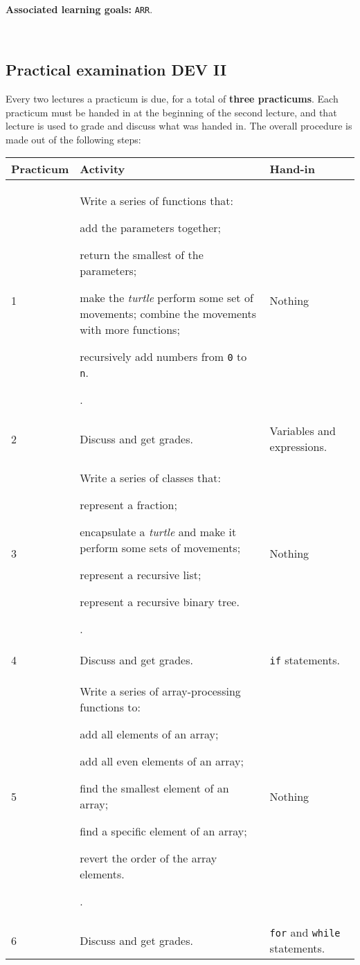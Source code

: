 \documentclass[12pt,a4paper,final]{article}
\begin{document}
\ \\ 

\textbf{Associated learning goals:} \texttt{ARR}.

\ \\ 

\subsection{Practical examination DEV II}
Every two lectures a practicum is due, for a total of \textbf{three practicums}. Each practicum must be handed in at the beginning of the second lecture, and that lecture is used to grade and discuss what was handed in. The overall procedure is made out of the following steps:

\begin{tabular}{| l | p{8cm} | p{4cm} |}
\hline
\textbf{Practicum} & \textbf{Activity} & \textbf{Hand-in} \\
\hline
1 & Write a series of functions that: 
\begin{inparaenum}
\item add the parameters together;
\item return the smallest of the parameters;
\item make the \textit{turtle} perform some set of movements; combine the movements with more functions;
\item recursively add numbers from \texttt{0} to \texttt{n}.
\end{inparaenum}. & Nothing \\
\hline
2 & Discuss and get grades. & Variables and expressions. \\
\hline
3 & Write a series of classes that:
\begin{inparaenum}
\item represent a fraction;
\item encapsulate a \textit{turtle} and make it perform some sets of movements;
\item represent a recursive list;
\item represent a recursive binary tree.
\end{inparaenum}. & Nothing \\
\hline
4 & Discuss and get grades. & \texttt{if} statements. \\
\hline
5 & Write a series of array-processing functions to:
\begin{inparaenum}
\item add all elements of an array;
\item add all even elements of an array;
\item find the smallest element of an array;
\item find a specific element of an array;
\item revert the order of the array elements.
\end{inparaenum}. & Nothing \\
\hline
6 & Discuss and get grades. & \texttt{for} and \texttt{while} statements. \\
\hline

\end{tabular}

\ \\
\end{document}
